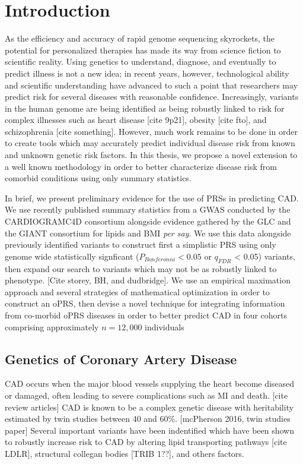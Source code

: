 \chapter{Introduction}
\label{introduction}

As the efficiency and accuracy of rapid genome sequencing skyrockets, the potential for personalized therapies has made its way from science fiction to scientific reality. Using genetics to understand, diagnose, and eventually to predict illness is not a new idea; in recent years, however, technological ability and scientific understanding have advanced to such a point that researchers may predict risk for several diseases with reasonable confidence. Increasingly, variants in the human genome are being identified as being robustly linked to risk for complex illnesses such as heart disease [\small{cite 9p21}], obesity [\small{cite fto}], and schizophrenia [\small{cite something}]. However, much work remains to be done in order to create tools which may accurately predict individual disease risk from known and unknown genetic risk factors. In this thesis, we propose a novel extension to a well known methodology in order to better characterize disease risk from comorbid conditions using only summary statistics. 

In brief, we present preliminary evidence for the use of \ac{PRS}s in predicting \ac{CAD}. We use recently published summary statistics from a \ac{GWAS} conducted by the \ac{CARDIOGRAMC4D} consortium alongside evidence gathered by the \ac{GLC} and the \ac{GIANT} consortium for lipids and \ac{BMI} \textit{per say}. We use this data alongside previously identified variants to construct first a simplistic \ac{PRS} using only genome wide statistically signficant ($P_{Bonferonni} < 0.05$ or $q_{FDR}$ < 0.05) variants, then expand our search to variants which may not be as robustly linked to phenotype. [Cite storey, BH, and dudbridge]. We use an empirical maximation approach and several strategies of mathematical optimization in order to construct an \ac{oPRS}, then devise a novel technique for integrating information from co-morbid \ac{oPRS} diseases in order to better predict \ac{CAD} in four cohorts comprising approximately $n=12,000$ individuals

\section{Genetics of Coronary Artery Disease}

\ac{CAD} occurs when the major blood vessels supplying the heart become diseased or damaged, often leading to severe complications such as \ac{MI} and death. [cite review articles] \ac{CAD} is known to be a complex genetic disease with heritability estimated by twin studies between 40 and 60\%. [mcPherson 2016, twin studies paper] Several important variants have been indentified which have been shown to robustly increase risk to \ac{CAD} by altering lipid transporting pathways [cite LDLR], structural collegan bodies [TRIB 1??], and others factors. 


